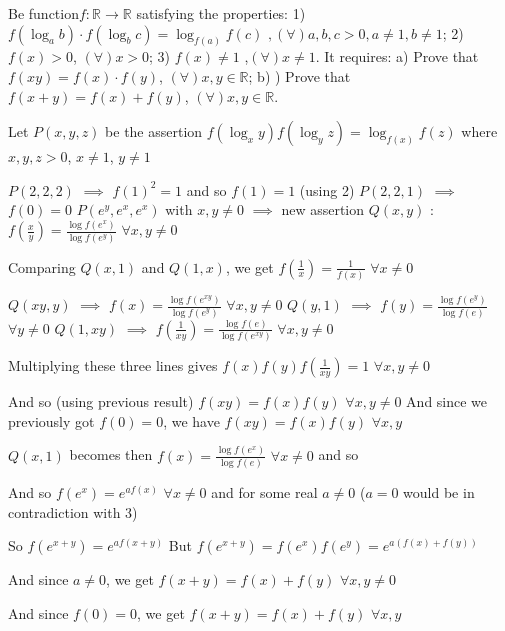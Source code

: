 \begin{solution}
	\begin{tcolorbox}Be function$f:\mathbb{R}\to \mathbb{R}$ satisfying the properties:     
     1)  $f\left( {{\log }_{a}}b \right)\cdot f\left( {{\log }_{b}}c \right)={{\log }_{f\left( a \right)}}f\left( c \right)$ $,\left( \forall  \right)a,b,c>0,a\ne 1,b\ne 1$;
     2)  $f\left( x \right)>0$, $\left( \forall  \right)x>0$;
     3)  $f\left( x \right)\ne 1$ ,$\left( \forall  \right)x\ne 1$.
It requires:
    a) Prove that $f\left( xy \right)=f\left( x \right)\cdot f\left( y \right)$,  $\left( \forall  \right)x,y\in \mathbb{R}$;
    b) ) Prove that $f\left( x+y \right)=f\left( x \right)+f\left( y \right)$, $\left( \forall  \right)x,y\in \mathbb{R}$.\end{tcolorbox}
Let $P(x,y,z)$ be the assertion $f(\log_xy)f(\log_yz)=\log_{f(x)}f(z)$ where $x,y,z>0$, $x\ne 1$, $y\ne 1$

$P(2,2,2)$ $\implies$ $f(1)^2=1$ and so $f(1)=1$ (using 2)
$P(2,2,1)$ $\implies$ $f(0)=0$
$P(e^y,e^x,e^x)$ with $x,y\ne 0$ $\implies$ new assertion $Q(x,y)$ : $f(\frac xy)=\frac{\log f(e^x)}{\log f(e^y)}$ $\forall x,y\ne 0$

Comparing $Q(x,1)$ and $Q(1,x)$, we get $f(\frac 1x)=\frac 1{f(x)}$ $\forall x\ne 0$

$Q(xy,y)$ $\implies$ $f(x)=\frac{\log f(e^{xy})}{\log f(e^y)}$ $\forall x,y\ne 0$
$Q(y,1)$ $\implies$ $f(y)=\frac{\log f(e^y)}{\log f(e)}$ $\forall y\ne 0$
$Q(1,xy)$ $\implies$ $f(\frac 1{xy})=\frac{\log f(e)}{\log f(e^{xy})}$ $\forall x,y\ne 0$

Multiplying these three lines gives $f(x)f(y)f(\frac 1{xy})=1$ $\forall x,y\ne 0$

And so (using previous result) $f(xy)=f(x)f(y)$ $\forall x,y\ne 0$
And since we previously got $f(0)=0$, we have $\boxed{f(xy)=f(x)f(y)}$ $\forall x,y$

$Q(x,1)$ becomes then $f(x)=\frac{\log f(e^x)}{\log f(e)}$ $\forall x\ne 0$ and so 

And so $f(e^x)=e^{af(x)}$ $\forall x\ne 0$ and for some real $a\ne 0$ ($a=0$ would be in contradiction with 3)

So $f(e^{x+y})=e^{af(x+y)}$
But $f(e^{x+y})=f(e^x)f(e^y)=e^{a(f(x)+f(y))}$

And since $a\ne 0$, we get $f(x+y)=f(x)+f(y)$ $\forall x,y\ne 0$

And since $f(0)=0$, we get $\boxed{f(x+y)=f(x)+f(y)}$ $\forall x,y$
\end{solution}



